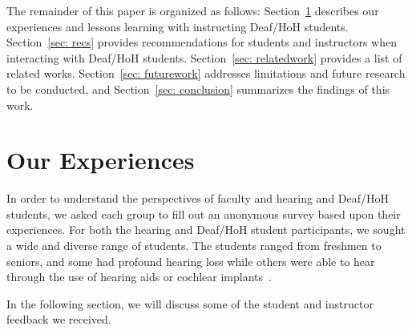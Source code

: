 \documentclass[conference]{IEEEtran}
\newcommand{\dan}[1]{\textcolor{blue}{{\it [Dan says: #1]}}}
\begin{document}
The remainder of this paper is organized as follows: Section~\ref{sec: ourexperiences} describes our experiences and lessons learning with instructing Deaf/HoH students. Section~\ref{sec: recs} provides recommendations for students and instructors when interacting with Deaf/HoH students. Section~\ref{sec: relatedwork} provides a list of related works. Section~\ref{sec: futurework} addresses limitations and future research to be conducted, and Section~\ref{sec: conclusion} summarizes the findings of this work.



\section{Our Experiences}
\label{sec: ourexperiences}

In order to understand the perspectives of faculty and hearing and Deaf/HoH students, we asked each group to fill out an anonymous survey based upon their experiences. For both the hearing and Deaf/HoH student participants, we sought a wide and diverse range of students.  The students ranged from freshmen to seniors, and some had profound hearing loss while others were able to hear through the use of hearing aids or cochlear implants~\cite{Zdenek:2007:FEV:1297144.1297198}.


In the following section, we will discuss some of the student and instructor feedback we received.
\end{document}

